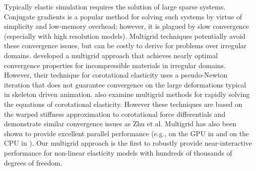 Typically elastic simulation requires the solution of large sparse systems. Conjugate gradients is a popular method for solving such systems by virtue of simplicity and low-memory overhead; however, it is plagued by slow convergence (especially with high resolution models). Multigrid techniques potentially avoid these convergence issues, but can be costly to derive for problems over irregular domains. \cite{Zhu:2010:EMM} developed a multigrid approach that achieves nearly optimal convergence properties for incompressible materials in irregular domains. However, their technique for corotational elasticity uses a pseudo-Newton iteration that does not guarantee convergence on the large deformations typical in skeleton driven animation. \cite{Dick:2011:CUDAFEM,Georgii06,Wu04} also examine multigrid methods for rapidly solving the equations of corotational elasticity. However these techniques are based on the warped stiffness approximation to corotational force differentials and demonstrate similar convergence issues as Zhu et al. Multigrid has also been shown to provide excellent parallel performance (e.g., on the GPU in \cite{Dick:2011:CUDAFEM} and on the CPU in \cite{Zhu:2010:EMM}). Our multigrid approach is the first to robustly provide near-interactive performance for non-linear elasticity models with hundreds of thousands of degrees of freedom.
